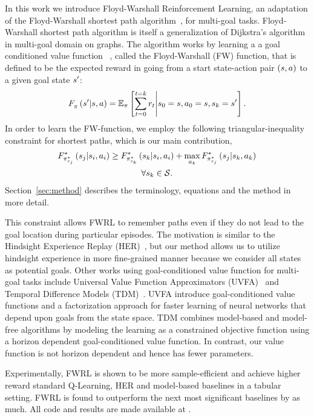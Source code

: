 In this work we introduce Floyd-Warshall Reinforcement Learning, an
adaptation of the Floyd-Warshall shortest path
algorithm~\citep{floydwarshall1962}, for multi-goal tasks.
Floyd-Warshall shortest path algorithm is itself a generalization of
Dijkstra's algorithm in multi-goal domain on graphs. The algorithm works
by learning a a goal conditioned value function
~\citep{schaul2015universal}, called the Floyd-Warshall (FW) function,
that is defined to be the expected reward in going from a start
state-action pair $(s, a)$ to a given goal state $s'$:
%
\begin{align}
F_{\pi}^{}\left({s'}\middle|{s}, {a}\right) =
\mathbb{E}_{\pi}\left[ \sum_{t=0}^{t=k} r_t \middle\vert s_0 = s, a_0 = s, s_k = s' \right] .
\end{align}%
%
In order to learn the FW-function, we employ the following triangular-inequality constraint for shortest paths, which is our main contribution,
%
\begin{multline}
\fwargs{\state_i}{\act_i}{\state_j}{\policy^*_{\state_j}}{*}
 \ge 
  \fwargs{\state_i}{\act_i}{\state_k}{\policy^*_{\state_k}}{*}
  + \max_{\act_k}\fwargs{\state_k}{\act_k}{\state_j}{\policy^*_{\state_j}}{*}
  \\
  \forall \state_k \in \State.
  \label{eq:fwconstraint}
\end{multline}%
%
Section~\ref{sec:method} describes the terminology, equations and the method in more detail.

This constraint allows FWRL to remember paths even if they do not lead to the goal
location during particular episodes. The motivation is similar to the Hindsight
Experience Replay (HER)~\citep{anderson2017vision}, but our method allows us to
utilize hindsight experience in more fine-grained manner because we consider all
states as potential goals. Other works using goal-conditioned value function for
multi-goal tasks include Universal Value Function Approximators
(UVFA)~\citep{schaul2015universal} and Temporal Difference Models
(TDM)~\citep{pong2018temporal}. UVFA introduce goal-conditioned value functions
and a factorization approach for faster learning of neural networks that depend
upon goals from the state space. TDM combines model-based and model-free
algorithms by modeling the learning as a constrained objective function using a
horizon dependent goal-conditioned value function. In contrast, our value
function is not horizon dependent and hence has fewer parameters.


Experimentally, FWRL is shown to be more sample-efficient and achieve
higher reward standard Q-Learning, HER and model-based baselines in a
tabular setting.  FWRL is found to outperform the next most significant
baselines by as much. All code and results are made available at
\href{}{}. 





